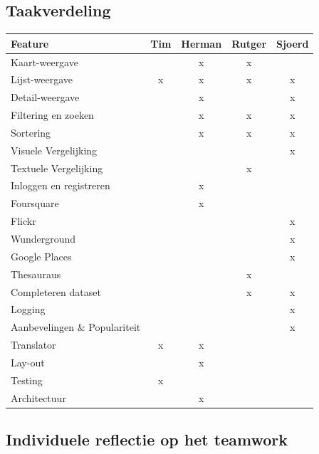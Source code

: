 \documentclass[a4paper,10pt]{article}
\begin{document}
	\subsection{Taakverdeling}
	\begin{tabular}{l || c | c | c | c}
  		Feature&					Tim&Herman&Rutger&Sjoerd\\
  		\hline
  		\hline						%
  		Kaart-weergave&					  & x & x &   \\
  		Lijst-weergave&					x & x & x & x \\
  		Detail-weergave&				  & x &   & x \\
  		Filtering en zoeken&			  & x & x & x \\
  		Sortering&						  & x & x & x \\
  		Visuele Vergelijking&			  &   &   & x \\
  		Textuele Vergelijking&			  &   & x &   \\
  		Inloggen en registreren&		  & x &   &   \\
  		Foursquare&			  			  & x &   &   \\
  		Flickr&				  			  &   &   & x \\
  		Wunderground&		  			  &   &   & x \\
  		Google Places&		  			  &   &   & x \\
  		Thesauraus&		  				  &   & x &   \\
  		Completeren dataset&	  		  &   & x & x \\
  		Logging&				  		  &   &   & x \\
  		Aanbevelingen \& Populariteit&	  &   &   & x \\
  		Translator&		  				x & x &   &   \\
  		Lay-out&			  			  & x &   &   \\
  		Testing&		  			  	x &   &   &   \\
  		Architectuur&                     & x &   &
  	\end{tabular}

	\subsection{Individuele reflectie op het teamwork}
		
\end{document}
